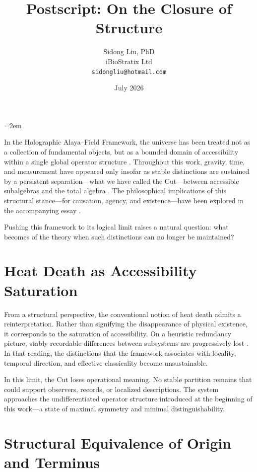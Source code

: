 \documentclass[12pt,a4paper]{article}
\title{Postscript: On the Closure of Structure}
\author{
  Sidong Liu, PhD \\
  iBioStratix Ltd \\
  \texttt{sidongliu@hotmail.com}
}
\date{July 2026}
\begin{document}
\emergencystretch=2em
\raggedbottom
{}

\maketitle


In the Holographic Alaya--Field Framework, the universe has been treated not as a collection of fundamental objects, but as a bounded domain of accessibility within a single global operator structure \cite{Liu2026PaperA,Liu2026PaperB}. Throughout this work, gravity, time, and measurement have appeared only insofar as stable distinctions are sustained by a persistent separation---what we have called the Cut---between accessible subalgebras and the total algebra \cite{Liu2026PaperE,Liu2026PaperG}. The philosophical implications of this structural stance---for causation, agency, and existence---have been explored in the accompanying essay \cite{Liu2026PaperC}.

Pushing this framework to its logical limit raises a natural question: what becomes of the theory when such distinctions can no longer be maintained?

\section*{Heat Death as Accessibility Saturation}

From a structural perspective, the conventional notion of heat death admits a reinterpretation. Rather than signifying the disappearance of physical existence, it corresponds to the saturation of accessibility. On a heuristic redundancy picture, stably recordable differences between subsystems are progressively lost \cite{Zurek2009}. In that reading, the distinctions that the framework associates with locality, temporal direction, and effective classicality become unsustainable.

In this limit, the Cut loses operational meaning. No stable partition remains that could support observers, records, or localized descriptions. The system approaches the undifferentiated operator structure introduced at the beginning of this work---a state of maximal symmetry and minimal distinguishability.

\section*{Structural Equivalence of Origin and Terminus}
\end{document}
